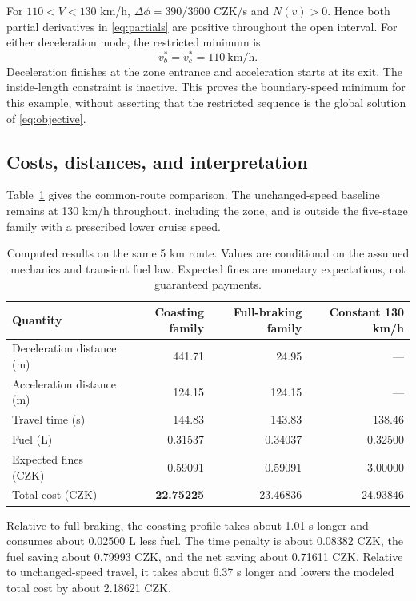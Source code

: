 \documentclass[10pt,a4paper]{article}
\begin{document}
For $110<V<130$ km/h, $\Delta\phi=390/3600$ CZK/s and $N(v)>0$. Hence both partial derivatives in \eqref{eq:partials} are positive throughout the open interval. For either deceleration mode, the restricted minimum is
\begin{equation}
v_b^*=v_c^*=110\ \mathrm{km/h}.
\end{equation}
Deceleration finishes at the zone entrance and acceleration starts at its exit. The inside-length constraint is inactive. This proves the boundary-speed minimum for this example, without asserting that the restricted sequence is the global solution of \eqref{eq:objective}.

\subsection{Costs, distances, and interpretation}
Table~\ref{tab:results} gives the common-route comparison. The unchanged-speed baseline remains at 130 km/h throughout, including the zone, and is outside the five-stage family with a prescribed lower cruise speed.
\begin{table}[htbp]
\centering
\caption{Computed results on the same 5 km route. Values are conditional on the assumed mechanics and transient fuel law. Expected fines are monetary expectations, not guaranteed payments.}
\label{tab:results}
\begin{tabular}{@{}lrrr@{}}
\toprule
Quantity & Coasting family & Full-braking family & Constant 130 km/h\\
\midrule
Deceleration distance (m) & 441.71 & 24.95 & ---\\
Acceleration distance (m) & 124.15 & 124.15 & ---\\
Travel time (s) & 144.83 & 143.83 & 138.46\\
Fuel (L) & 0.31537 & 0.34037 & 0.32500\\
Expected fines (CZK) & 0.59091 & 0.59091 & 3.00000\\
Total cost (CZK) & \textbf{22.75225} & 23.46836 & 24.93846\\
\bottomrule
\end{tabular}
\end{table}

Relative to full braking, the coasting profile takes about 1.01 s longer and consumes about 0.02500 L less fuel. The time penalty is about 0.08382 CZK, the fuel saving about 0.79993 CZK, and the net saving about 0.71611 CZK. Relative to unchanged-speed travel, it takes about 6.37 s longer and lowers the modeled total cost by about 2.18621 CZK.
\end{document}
